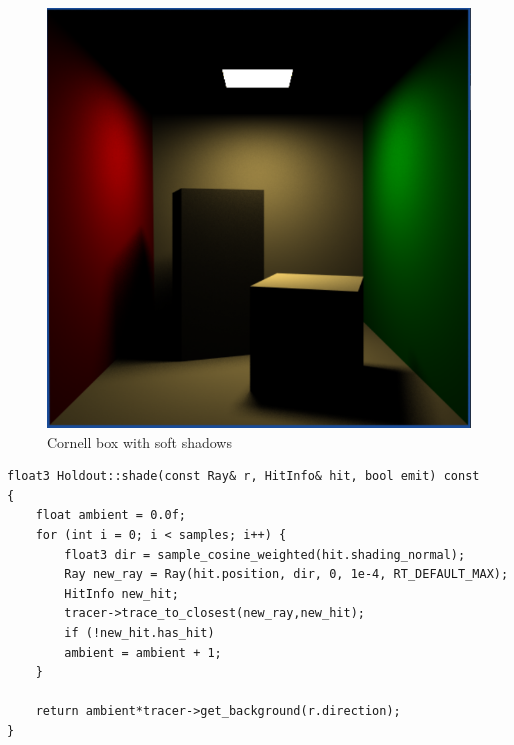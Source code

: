\begin{figure}[H]
	\centering
	\includegraphics[scale=\imagescale]{images/worksheet_9/soft_shadow}
	\caption{Cornell box with soft shadows}
	\label{fig:cornell_soft_shadows}
\end{figure}

\begin{lstlisting}
float3 Holdout::shade(const Ray& r, HitInfo& hit, bool emit) const
{
	float ambient = 0.0f;
	for (int i = 0; i < samples; i++) {
		float3 dir = sample_cosine_weighted(hit.shading_normal);
		Ray new_ray = Ray(hit.position, dir, 0, 1e-4, RT_DEFAULT_MAX);
		HitInfo new_hit;
		tracer->trace_to_closest(new_ray,new_hit);
		if (!new_hit.has_hit)
		ambient = ambient + 1;
	}
	
	return ambient*tracer->get_background(r.direction);
}
\end{lstlisting}

